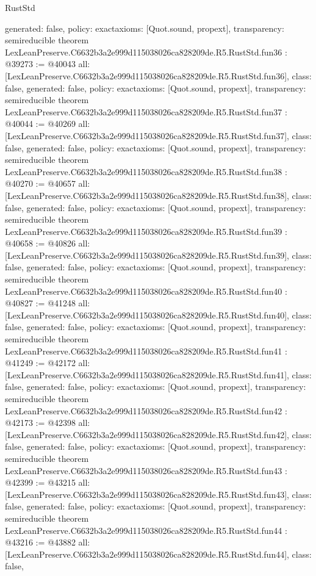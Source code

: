 \begin{lexlean}{RustStd}
\begin{coremodule}
{  generated: false,
  policy: exact{axioms: [Quot.sound, propext]},
  transparency: semireducible
}
theorem LexLeanPreserve.C6632b3a2e999d115038026ca828209de.R5.RustStd.fun36 : @39273 := @40043 {
  all: [LexLeanPreserve.C6632b3a2e999d115038026ca828209de.R5.RustStd.fun36],
  class: false,
  generated: false,
  policy: exact{axioms: [Quot.sound, propext]},
  transparency: semireducible
}
theorem LexLeanPreserve.C6632b3a2e999d115038026ca828209de.R5.RustStd.fun37 : @40044 := @40269 {
  all: [LexLeanPreserve.C6632b3a2e999d115038026ca828209de.R5.RustStd.fun37],
  class: false,
  generated: false,
  policy: exact{axioms: [Quot.sound, propext]},
  transparency: semireducible
}
theorem LexLeanPreserve.C6632b3a2e999d115038026ca828209de.R5.RustStd.fun38 : @40270 := @40657 {
  all: [LexLeanPreserve.C6632b3a2e999d115038026ca828209de.R5.RustStd.fun38],
  class: false,
  generated: false,
  policy: exact{axioms: [Quot.sound, propext]},
  transparency: semireducible
}
theorem LexLeanPreserve.C6632b3a2e999d115038026ca828209de.R5.RustStd.fun39 : @40658 := @40826 {
  all: [LexLeanPreserve.C6632b3a2e999d115038026ca828209de.R5.RustStd.fun39],
  class: false,
  generated: false,
  policy: exact{axioms: [Quot.sound, propext]},
  transparency: semireducible
}
theorem LexLeanPreserve.C6632b3a2e999d115038026ca828209de.R5.RustStd.fun40 : @40827 := @41248 {
  all: [LexLeanPreserve.C6632b3a2e999d115038026ca828209de.R5.RustStd.fun40],
  class: false,
  generated: false,
  policy: exact{axioms: [Quot.sound, propext]},
  transparency: semireducible
}
theorem LexLeanPreserve.C6632b3a2e999d115038026ca828209de.R5.RustStd.fun41 : @41249 := @42172 {
  all: [LexLeanPreserve.C6632b3a2e999d115038026ca828209de.R5.RustStd.fun41],
  class: false,
  generated: false,
  policy: exact{axioms: [Quot.sound, propext]},
  transparency: semireducible
}
theorem LexLeanPreserve.C6632b3a2e999d115038026ca828209de.R5.RustStd.fun42 : @42173 := @42398 {
  all: [LexLeanPreserve.C6632b3a2e999d115038026ca828209de.R5.RustStd.fun42],
  class: false,
  generated: false,
  policy: exact{axioms: [Quot.sound, propext]},
  transparency: semireducible
}
theorem LexLeanPreserve.C6632b3a2e999d115038026ca828209de.R5.RustStd.fun43 : @42399 := @43215 {
  all: [LexLeanPreserve.C6632b3a2e999d115038026ca828209de.R5.RustStd.fun43],
  class: false,
  generated: false,
  policy: exact{axioms: [Quot.sound, propext]},
  transparency: semireducible
}
theorem LexLeanPreserve.C6632b3a2e999d115038026ca828209de.R5.RustStd.fun44 : @43216 := @43882 {
  all: [LexLeanPreserve.C6632b3a2e999d115038026ca828209de.R5.RustStd.fun44],
  class: false,
}
\end{coremodule}
\end{lexlean}

